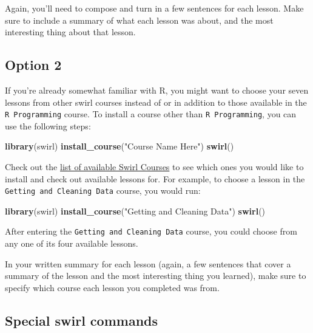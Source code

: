 \documentclass[]{book}
\makeatletter
\newenvironment{Shaded}{\begin{snugshade}}{\end{snugshade}}
\newcommand{\KeywordTok}[1]{\textcolor[rgb]{0.13,0.29,0.53}{\textbf{#1}}}
\newcommand{\StringTok}[1]{\textcolor[rgb]{0.31,0.60,0.02}{#1}}
\newcommand{\NormalTok}[1]{#1}
\newenvironment{kframe}{%
\medskip{}
\setlength{\fboxsep}{.8em}
 \def\at@end@of@kframe{}%
 \ifinner\ifhmode%
  \def\at@end@of@kframe{\end{minipage}}%
  \begin{minipage}{\columnwidth}%
 \fi\fi%
 \def\FrameCommand##1{\hskip\@totalleftmargin \hskip-\fboxsep
 \colorbox{shadecolor}{##1}\hskip-\fboxsep
     \hskip-\linewidth \hskip-\@totalleftmargin \hskip\columnwidth}%
 \MakeFramed {\advance\hsize-\width
   \@totalleftmargin\z@ \linewidth\hsize
   \@setminipage}}%
 {\par\unskip\endMakeFramed%
 \at@end@of@kframe}
\renewenvironment{Shaded}{\begin{kframe}}{\end{kframe}}
\theoremstyle{definition}
\theoremstyle{definition}
\theoremstyle{definition}
\theoremstyle{remark}
\makeatother
\begin{document}
Again, you'll need to compose and turn in a few sentences for each
lesson. Make sure to include a summary of what each lesson was about,
and the most interesting thing about that lesson.

\subsection{Option 2}\label{option-2}

If you're already somewhat familiar with R, you might want to choose
your seven lessons from other swirl courses instead of or in addition to
those available in the \texttt{R\ Programming} course. To install a
course other than \texttt{R\ Programming}, you can use the following
steps:

\begin{Shaded}
\begin{Highlighting}[]
\KeywordTok{library}\NormalTok{(swirl)}
\KeywordTok{install_course}\NormalTok{(}\StringTok{"Course Name Here"}\NormalTok{)}
\KeywordTok{swirl}\NormalTok{()}
\end{Highlighting}
\end{Shaded}

Check out the \href{http://swirlstats.com/scn/title.html}{list of
available Swirl Courses} to see which ones you would like to install and
check out available lessons for. For example, to choose a lesson in the
\texttt{Getting\ and\ Cleaning\ Data} course, you would run:

\begin{Shaded}
\begin{Highlighting}[]
\KeywordTok{library}\NormalTok{(swirl)}
\KeywordTok{install_course}\NormalTok{(}\StringTok{"Getting and Cleaning Data"}\NormalTok{)}
\KeywordTok{swirl}\NormalTok{()}
\end{Highlighting}
\end{Shaded}

After entering the \texttt{Getting\ and\ Cleaning\ Data} course, you
could choose from any one of its four available lessons.

In your written summary for each lesson (again, a few sentences that
cover a summary of the lesson and the most interesting thing you
learned), make sure to specify which course each lesson you completed
was from.

\subsection{Special swirl commands}\label{special-swirl-commands}
\end{document}
